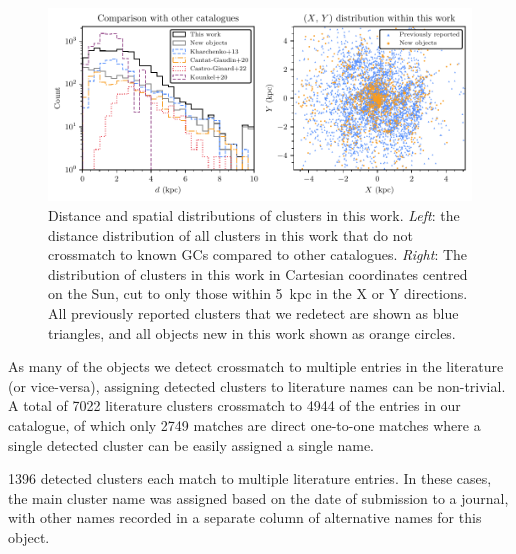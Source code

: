 \begin{table}
\begin{tabular}{*{11}{c}}
\hline
\end{tabular}
\end{table}


\begin{figure}[t]
   \centering
   \includegraphics[width=\textwidth]{fig/c3/fig_methods_d_distribution.pdf}
   \caption[Distance and spatial distributions of clusters in this work]{Distance and spatial distributions of clusters in this work. \emph{Left}: the distance distribution of all clusters in this work that do not crossmatch to known GCs compared to other catalogues. \emph{Right}: The distribution of clusters in this work in Cartesian coordinates centred on the Sun, cut to only those within 5~kpc in the X or Y directions. All previously reported clusters that we redetect are shown as blue triangles, and all objects new in this work shown as orange circles.}%
   \label{c3:fig:distance_distribution}
\end{figure}

As many of the objects we detect crossmatch to multiple entries in the literature (or vice-versa), assigning detected clusters to literature names can be non-trivial. A total of 7022 literature clusters crossmatch to 4944 of the entries in our catalogue, of which only 2749 matches are direct one-to-one matches where a single detected cluster can be easily assigned a single name.

1396 detected clusters each match to multiple literature entries. In these cases, the main cluster name was assigned based on the date of submission to a journal, with other names recorded in a separate column of alternative names for this object.

